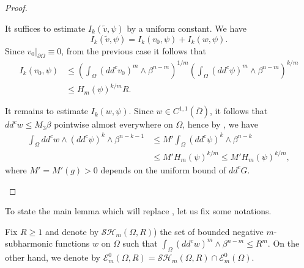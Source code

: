 \documentclass[11pt]{article}
\numberwithin{equation}{section}
\theoremstyle{definition}
\theoremstyle{plain}
\theoremstyle{definition}
\begin{document}
\begin{proof}
\begin{enumerate}
It suffices to estimate $ I_k (\tilde v,\psi) $ by a uniform constant. We have
\[
I_k (\tilde v,\psi) = I_k (v_0, \psi) + I_k (w,\psi).
\]
Since $v_0|_{\partial \Omega} \equiv 0$, from the previous case it follows that
\begin{align*}
I_k (v_0,\psi) & \leq  \left(\int_\Omega (dd^c v_0)^m \wedge \beta^{n-m}\right)^{1 \slash m} \left(\int_\Omega (dd^c \psi)^m \wedge \beta^{n-m}\right)^{k \slash m} \\
&\leq  H_m (\psi)^{k\slash m} R.
\end{align*}

It remains to estimate $ I_k (w,\psi)$.
Since $w \in C^{1,1} (\bar{\Omega})$, it follows that $dd^c w \leq M_3 \beta$ pointwise almost everywhere on $\Omega$, hence by \cite[Lem.\,2.8]{BZ20} , we have
\begin{align*}
\int_\Omega dd^c w \wedge (dd^c \psi)^k \wedge \beta^{n-k-1} &\leq  M' \int_\Omega (dd^c \psi) ^k \wedge \beta^{n-k} \\
& \leq  M' H_m (\psi)^{k\slash m} \leq M' H_m (\psi)^{k\slash m},
\end{align*}
where $M' = M'(g) > 0$ depends on the uniform bound of $dd^c G$.\qedhere
\end{enumerate}
\end{proof}

To state the main lemma which will replace \cite[Lem.\,4.2]{BZ20}, let us fix some notations.

Fix $R \geq 1$ and denote by $\mathcal{SH}_m (\Omega,R)$) the set of bounded negative $m$-subharmonic functions $w$ on $\Omega$ such that $\int_\Omega (dd^c w)^m \wedge \beta^{n-m} \leq R^m$.
On the other hand, we denote by $ \mathcal{E}_m^0 (\Omega,R) = \mathcal{SH}_m (\Omega,R) \cap \mathcal{E}^0_m (\Omega)$.
\end{document}
